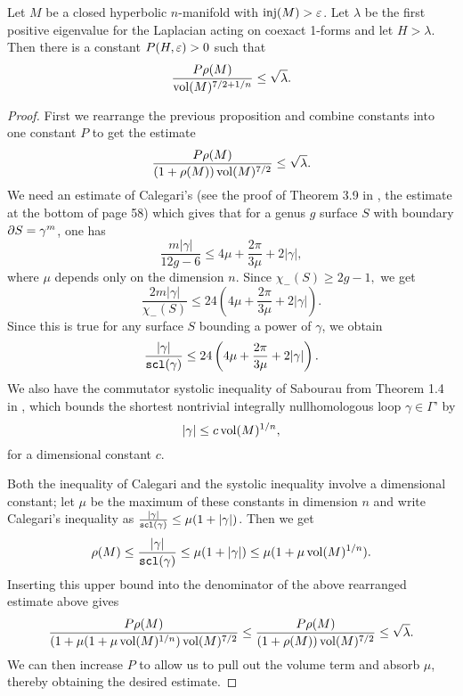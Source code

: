 \begin{mainthm}\label{thm:B}
Let $M$ be a closed hyperbolic $n$-manifold with $\operatorname{inj}(M) > \varepsilon$. Let $\lambda$ be the first positive eigenvalue for the Laplacian acting on coexact 1-forms and let $H > \lambda$. Then there is a constant $P(H,\varepsilon)>0$ such that $$ \frac{P\rho(M)}{\operatorname{vol}(M)^{7/2+1/n}}\leq\sqrt{\lambda}.$$
\end{mainthm}
\begin{proof}
First we rearrange the previous proposition and combine constants into one constant $P$ to get the estimate $$\frac{P\rho(M)}{(1+\rho(M))\operatorname{vol}(M)^{7/2}}\leq\sqrt{\lambda}.$$ We need an estimate of Calegari’s (see the proof of Theorem 3.9 in \cite{Calegari}, the estimate at the bottom of page 58) which gives that for a genus $g$ surface $S$ with boundary $\partial S = \gamma^m$,
one has $$\frac{m|\gamma|}{12g-6}\leq 4\mu + \frac{2\pi}{3\mu} + 2|\gamma|,$$ where $\mu$ depends only on the dimension $n$. Since $\chi_-(S)\geq2g-1,$ we get $$\frac{2m|\gamma|}{\chi_-(S)}\leq 24\left(4\mu + \frac{2\pi}{3\mu} + 2|\gamma|\right).$$
Since this is true for any surface $S$ bounding a power of $\gamma$, we obtain $$\frac{|\gamma|}{\operatorname{{\tt{scl}}}(\gamma)}\leq 24\left(4\mu + \frac{2\pi}{3\mu} + 2|\gamma|\right).$$
We also have the commutator systolic inequality of Sabourau from Theorem 1.4 in \cite{Sab}, which bounds the shortest nontrivial integrally nullhomologous loop $\gamma\in \Gamma’$ by $$|\gamma|\leq c\operatorname{vol}(M)^{1/n},$$ for a dimensional constant $c$.

Both the inequality of Calegari and the systolic inequality involve a dimensional constant; let $\mu$ be the maximum of these constants in dimension $n$ and write Calegari’s inequality as $\frac{|\gamma|}{\operatorname{{\tt{scl}}}(\gamma)} \leq \mu(1+|\gamma|)$. Then we get $$ \rho(M)\leq \frac{|\gamma|}{\operatorname{{\tt{scl}}}(\gamma)}\leq \mu(1 + |\gamma|) \leq \mu (1+ \mu\operatorname{vol}(M)^{1/n}).$$
Inserting this upper bound into the denominator of the above rearranged estimate above gives $$\frac{P\rho(M)}{(1 + \mu(1+\mu\operatorname{vol}(M)^{1/n})\operatorname{vol}(M)^{7/2}}\leq \frac{P\rho(M)}{(1+\rho(M))\operatorname{vol}(M)^{7/2}} \leq \sqrt{\lambda}.$$ We can then increase $P$ to allow us to pull out the volume term and absorb $\mu$, thereby obtaining the desired estimate.
\end{proof}

